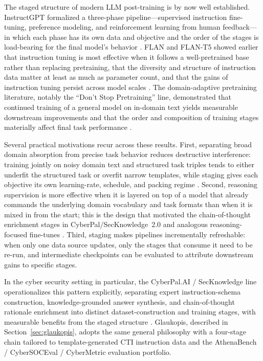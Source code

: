 \documentclass[unnumsec,webpdf,contemporary,large]{oup-authoring-template}
\theoremstyle{thmstyleone}
\theoremstyle{thmstyletwo}
\theoremstyle{thmstylethree}
\begin{document}
The staged structure of modern LLM post-training is by now well established. InstructGPT formalized a three-phase pipeline---supervised instruction fine-tuning, preference modeling, and reinforcement learning from human feedback---in which each phase has its own data and objective and the order of the stages is load-bearing for the final model's behavior \cite{ouyang2022instructgpt}. FLAN and FLAN-T5 showed earlier that instruction tuning is most effective when it follows a well-pretrained base rather than replacing pretraining, that the diversity and structure of instruction data matter at least as much as parameter count, and that the gains of instruction tuning persist across model scales \cite{wei2022flan,chung2022flant5}. The domain-adaptive pretraining literature, notably the ``Don't Stop Pretraining'' line, demonstrated that continued training of a general model on in-domain text yields measurable downstream improvements and that the order and composition of training stages materially affect final task performance \cite{gururangan2020dontstop}.

Several practical motivations recur across these results. First, separating broad domain absorption from precise task behavior reduces destructive interference: training jointly on noisy domain text and structured task triples tends to either underfit the structured task or overfit narrow templates, while staging gives each objective its own learning-rate, schedule, and packing regime \cite{gururangan2020dontstop,ouyang2022instructgpt}. Second, reasoning supervision is more effective when it is layered on top of a model that already commands the underlying domain vocabulary and task formats than when it is mixed in from the start; this is the design that motivated the chain-of-thought enrichment stages in CyberPal/SecKnowledge~2.0 and analogous reasoning-focused fine-tunes \cite{wei2022cot,levi2025toward}. Third, staging makes pipelines incrementally refreshable: when only one data source updates, only the stages that consume it need to be re-run, and intermediate checkpoints can be evaluated to attribute downstream gains to specific stages.

In the cyber security setting in particular, the CyberPal.AI / SecKnowledge line operationalizes this pattern explicitly, separating expert instruction-schema construction, knowledge-grounded answer synthesis, and chain-of-thought rationale enrichment into distinct dataset-construction and training stages, with measurable benefits from the staged structure \cite{levi2024cyberpal,levi2025toward}. Glaukopis, described in Section~\ref{sec:glaukopis}, adopts the same general philosophy with a four-stage chain tailored to template-generated CTI instruction data and the AthenaBench / CyberSOCEval / CyberMetric evaluation portfolio.
\end{document}
